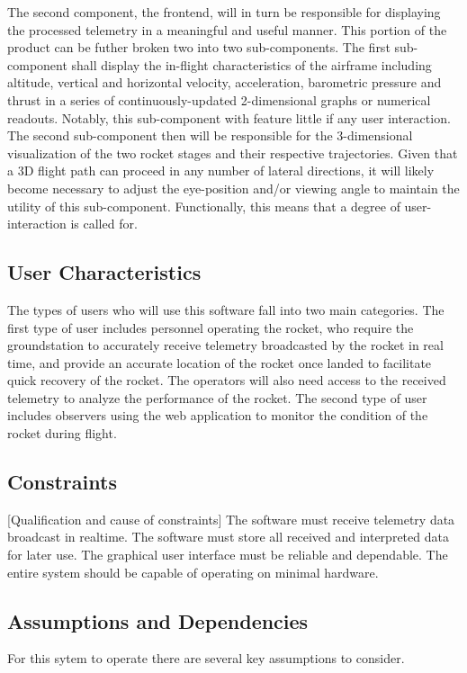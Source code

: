 \documentclass[onecolumn, draftclsnofoot,10pt, compsoc]{IEEEtran}
\begin{document}
			The second component, the frontend, will in turn be responsible for displaying the processed telemetry in a meaningful and useful manner.
			This portion of the product can be futher broken two into two sub-components.
			The first sub-component shall display the in-flight characteristics of the airframe including altitude, vertical and horizontal velocity, acceleration, barometric pressure and thrust in a series of continuously-updated 2-dimensional graphs or numerical readouts. 
			Notably, this sub-component with feature little if any user interaction. 
			The second sub-component then will be responsible for the 3-dimensional visualization of the two rocket stages and their respective trajectories. 
			Given that a 3D flight path can proceed in any number of lateral directions, it will likely become necessary to adjust the eye-position and/or viewing angle to maintain the utility of this sub-component.
			Functionally, this means that a degree of user-interaction is called for.
			
		\subsection{User Characteristics}
			The types of users who will use this software fall into two main categories. 
			The first type of user includes personnel operating the rocket, who require the groundstation to accurately receive telemetry broadcasted by the rocket in real time, and provide an accurate location of the rocket once landed to facilitate quick recovery of the rocket.
			The operators will also need access to the received telemetry to analyze the performance of the rocket.
			The second type of user includes observers using the web application to monitor the condition of the rocket during flight.

		\subsection{Constraints}
			[Qualification and cause of constraints]
			The software must receive telemetry data broadcast in realtime.
			The software must store all received and interpreted data for later use.
			The graphical user interface must be reliable and dependable.
			The entire system should be capable of operating on minimal hardware.

		\subsection{Assumptions and Dependencies}
			For this sytem to operate there are several key assumptions to consider.
			
\end{document}
